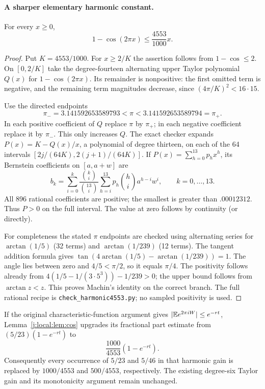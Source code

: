 \paragraph{A sharper elementary harmonic constant.}
\begin{lemma}\label{j:local:lem:cos}
For every $x\ge0$,
\[
               1-\cos(2\pi x)\le\frac{4553}{1000}x.
\]
\end{lemma}
\begin{proof}
Put $K=4553/1000$. For $x\ge2/K$ the assertion follows from
$1-\cos\le2$. On $[0,2/K]$ take the degree-fourteen alternating upper
Taylor polynomial $Q(x)$ for $1-\cos(2\pi x)$. Its remainder is nonpositive:
the first omitted term is negative, and the remaining term magnitudes
decrease, since $(4\pi/K)^2<16\cdot15$.

Use the directed endpoints
\[
 \pi_-=3.141592653589793<\pi<3.141592653589794=\pi_+.
\]
In each positive coefficient of $Q$ replace $\pi$ by $\pi_+$; in each
negative coefficient replace it by $\pi_-$. This only increases $Q$.
The exact checker expands $P(x)=K-Q(x)/x$, a polynomial of degree thirteen,
on each of the 64 intervals $[2j/(64K),2(j+1)/(64K)]$. If
$P(x)=\sum_{h=0}^{13}p_hx^h$, its Bernstein coefficients on $[a,a+w]$ are
\[
 b_k=\sum_{i=0}^k\frac{\binom ki}{\binom{13}i}
        \sum_{h=i}^{13}p_h\binom hi a^{h-i}w^i,
               \qquad k=0,\ldots,13.
\]
All 896 rational coefficients are positive; the smallest is greater than
$.00012312$. Thus $P>0$ on the full interval. The value at zero follows by
continuity (or directly).

For completeness the stated $\pi$ endpoints are checked using alternating
series for $\arctan(1/5)$ (32 terms) and $\arctan(1/239)$ (12 terms).
The tangent addition formula gives
$\tan(4\arctan(1/5)-\arctan(1/239))=1$.
The angle lies between zero and $4/5<\pi/2$, so it equals $\pi/4$.
The positivity follows already from
$4(1/5-1/(3\cdot5^3))-1/239>0$; the upper bound follows from
$\arctan z<z$. This proves Machin's identity on the correct branch.
The full rational recipe is \texttt{check\_harmonic4553.py}; no sampled
positivity is used.
\end{proof}

If the original characteristic-function argument gives
$|\mathbb E e^{2\pi iW}|\le e^{-rt}$, Lemma~\ref{j:local:lem:cos} upgrades its fractional
part estimate from $(5/23)(1-e^{-rt})$ to
\[
                 \frac{1000}{4553}(1-e^{-rt}).
\]
Consequently every occurrence of $5/23$ and $5/46$ in that harmonic gain is
replaced by $1000/4553$ and $500/4553$, respectively. The existing degree-six
Taylor gain and its monotonicity argument remain unchanged.



